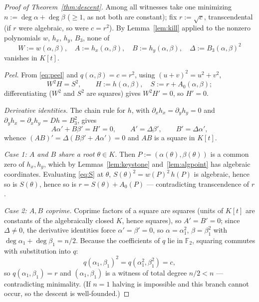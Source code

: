 \documentclass[11pt]{article}
\theoremstyle{definition}
\newcommand{\F}{\mathbb{F}}
\begin{document}
\begin{proof}[Proof of Theorem~\ref{thm:descent}]
Among all witnesses take one minimizing
$n := \deg\alpha + \deg\beta$ ($\geq 1$, as not both are constant);
fix $r := \sqrt{c}$, transcendental (if $r$ were algebraic, so were
$c = r^2$).  By Lemma~\ref{lem:kill} applied to the nonzero
polynomials $w$, $h_x$, $h_y$, $B_3$, none of
\[
  W := w(\alpha,\beta), \quad
  A := h_x(\alpha,\beta), \quad
  B := h_y(\alpha,\beta), \quad
  \Delta := B_3(\alpha,\beta)^2
\]
vanishes in $K[t]$.

\emph{Peel.}  From \eqref{eq:peel} and $q(\alpha,\beta) = c = r^2$,
using $(u+v)^2 = u^2 + v^2$,
\begin{equation}\label{eq:S}
  W^2 H = S^2,
  \qquad
  H := h(\alpha,\beta), \quad S := r + A_0(\alpha,\beta);
\end{equation}
differentiating ($W^2$ and $S^2$ are squares) gives $W^2 H' = 0$,
so $H' = 0$.

\emph{Derivative identities.}  The chain rule for $h$, with
$\partial_x h_x = \partial_y h_y = 0$ and
$\partial_y h_x = \partial_x h_y = Dh = B_3^2$, gives
\[
  A\alpha' + B\beta' = H' = 0,
  \qquad A' = \Delta\beta', \qquad B' = \Delta\alpha' ,
\]
whence $(AB)' = \Delta(B\beta' + A\alpha') = 0$ and $AB$ is a square
in $K[t]$.

\emph{Case 1: $A$ and $B$ share a root $\theta \in K$.}  Then
$P := (\alpha(\theta), \beta(\theta))$ is a common zero of
$h_x, h_y$, which by Lemmas~\ref{lem:keystone}
and~\ref{lem:algpoint} has algebraic coordinates.  Evaluating
\eqref{eq:S} at $\theta$, $S(\theta)^2 = w(P)^2\, h(P)$ is algebraic,
hence so is $S(\theta)$, hence so is $r = S(\theta) + A_0(P)$ ---
contradicting transcendence of $r$.

\emph{Case 2: $A, B$ coprime.}  Coprime factors of a square
are squares (units of $K[t]$ are constants of the algebraically
closed $K$, hence squares), so $A' = B' = 0$; since $\Delta \neq 0$,
the derivative identities force $\alpha' = \beta' = 0$, so
$\alpha = \alpha_1^2$, $\beta = \beta_1^2$ with
$\deg\alpha_1 + \deg\beta_1 = n/2$.  Because the coefficients of $q$
lie in $\F_2$, squaring commutes with substitution into $q$:
\[
  q(\alpha_1, \beta_1)^2 = q(\alpha_1^2, \beta_1^2) = c,
\]
so $q(\alpha_1,\beta_1) = r$ and $(\alpha_1, \beta_1)$ is a witness
of total degree $n/2 < n$ --- contradicting minimality.  (If $n = 1$
halving is impossible and this branch cannot occur, so the descent
is well-founded.)
\end{proof}
\end{document}

